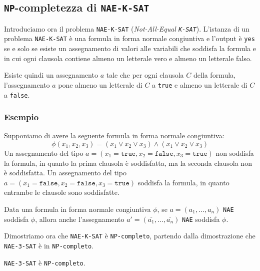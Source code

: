 \subsection{\texttt{NP}-completezza di \texttt{NAE-K-SAT}}
Introduciamo ora il problema \texttt{NAE-K-SAT} (\textit{Not-All-Equal \texttt{K-SAT}}).
L'istanza di un problema \texttt{NAE-K-SAT} è una formula in forma normale congiuntiva 
e l'output è \texttt{yes} se e solo se esiste un assegnamento di valori alle variabili 
che soddisfa la formula e in cui ogni clausola contiene almeno un letterale vero e almeno
un letterale falso.

Esiste quindi un assegnamento $a$ tale che per ogni clausola $C$ della formula, l'assegnamento 
$a$ pone almeno un letterale di $C$ a \texttt{true} e almeno un letterale di $C$ a \texttt{false}.

\subsubsection{Esempio}
Supponiamo di avere la seguente formula in forma normale congiuntiva:
\[
    \phi(x_1, x_2, x_3) = (x_1 \lor \overline{x_2} \lor x_3)
    \land (\overline{x_1} \lor \overline{x_2} \lor x_3)
\]
Un assegnamento del tipo $a = (x_1 = \texttt{true}, x_2 = \texttt{false}, x_3 = \texttt{true})$
non soddisfa la formula, in quanto la prima clausola è soddisfatta, ma la seconda clausola
non è soddisfatta. Un assegnamento del tipo $a = (x_1 = \texttt{false}, x_2 = \texttt{false},
x_3 = \texttt{true})$
soddisfa la formula, in quanto entrambe le clausole sono soddisfatte.

\begin{lemma}
    Data una formula in forma normale congiuntiva $\phi$, se $a=(a_1, \ldots, a_n)$
    \texttt{NAE} soddisfa $\phi$, allora anche l'assegnamento
    $a'=(\overline{a_1}, \ldots, \overline{a_n})$ \texttt{NAE}
    soddisfa $\phi$.
\end{lemma}

Dimostriamo ora che \texttt{NAE-K-SAT} è \texttt{NP-completo}, partendo dalla dimostrazione
che \texttt{NAE-3-SAT} è in \texttt{NP-completo}.
\begin{theorem}
    \texttt{NAE-3-SAT} è \texttt{NP-completo}.
\end{theorem}

